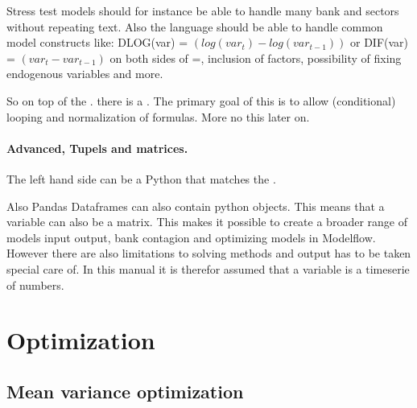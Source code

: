 \documentclass[letterpaper,10pt,english]{jupyterBook}
\begin{document}
\sphinxAtStartPar
Stress test models should for instance be able to handle many bank and sectors without repeating text. Also the language should be able to handle common model constructs like: DLOG(var) = \((log(var_t)-log(var_{t-1}))\) or DIF(var) = \((var_t-var_{t-1})\) on both sides of =, inclusion of factors, possibility of fixing endogenous variables and more.

\sphinxAtStartPar
So on top of the . there is a . The primary goal of this is to allow (conditional) looping and normalization of formulas. More no this later on.


\subsection{Advanced, Tupels and matrices.}
\label{\detokenize{content/notebooks/intro/model specification:advanced-tupels-and-matrices}}
\sphinxAtStartPar
The left hand side can be a Python  that matches the .

\sphinxAtStartPar
Also Pandas Dataframes can also contain python objects. This means that a variable can also be a matrix. This makes it possible to create a broader range of models \sphinxhyphen{} input output, bank contagion and optimizing models \sphinxhyphen{} in Modelflow. However there are also limitations to solving methods and output has to be taken special care of. In this manual it is therefor assumed that a variable is a timeserie of numbers.

\sphinxstepscope


\part{Optimization}

\sphinxstepscope


\chapter{Mean variance optimization}
\label{\detokenize{content/howto/optimization/Optimize_simpel:mean-variance-optimization}}\label{\detokenize{content/howto/optimization/Optimize_simpel::doc}}
\sphinxAtStartPar
{}
\end{document}
